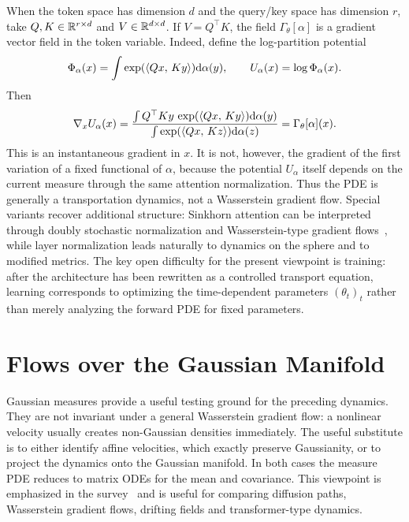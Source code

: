 When the token space has dimension $d$ and the query/key space has dimension $r$, take $Q,K\in\mathbb{R}^{r\times d}$ and $V\in\mathbb{R}^{d\times d}$. If $V=Q^\top K$, the field $\Gamma_\theta[\alpha]$ is a gradient vector field in the token variable. Indeed, define the log-partition potential
\[
	\Phi_\alpha(x)
	=
	\int \exp(\langle Qx,\,Ky\rangle)\mathrm{d}\alpha(y),
	\qquad
	U_\alpha(x)=\log\Phi_\alpha(x).
\]
Then
\[
	\nabla_x U_\alpha(x)
	=
	\frac{\int Q^\top K y\,\exp(\langle Qx,\,Ky\rangle)\mathrm{d}\alpha(y)}
	     {\int \exp(\langle Qx,\,Kz\rangle)\mathrm{d}\alpha(z)}
	=
	\Gamma_\theta[\alpha](x).
\]
This is an instantaneous gradient in $x$. It is not, however, the gradient of the first variation of a fixed functional of $\alpha$, because the potential $U_\alpha$ itself depends on the current measure through the same attention normalization. Thus the PDE is generally a transportation dynamics, not a Wasserstein gradient flow. Special variants recover additional structure: Sinkhorn attention can be interpreted through doubly stochastic normalization and Wasserstein-type gradient flows~\cite{Sander2022Sinkformers,Castin2025DynamicsTransformers}, while layer normalization leads naturally to dynamics on the sphere and to modified metrics. The key open difficulty for the present viewpoint is training: after the architecture has been rewritten as a controlled transport equation, learning corresponds to optimizing the time-dependent parameters $(\theta_t)_t$ rather than merely analyzing the forward PDE for fixed parameters.

\section{Flows over the Gaussian Manifold}

Gaussian measures provide a useful testing ground for the preceding dynamics. They are not invariant under a general Wasserstein gradient flow: a nonlinear velocity usually creates non-Gaussian densities immediately. The useful substitute is to either identify affine velocities, which exactly preserve Gaussianity, or to project the dynamics onto the Gaussian manifold. In both cases the measure PDE reduces to matrix ODEs for the mean and covariance. This viewpoint is emphasized in the survey~\cite{Peyre2026OptimalDiffusionTransports} and is useful for comparing diffusion paths, Wasserstein gradient flows, drifting fields and transformer-type dynamics.


